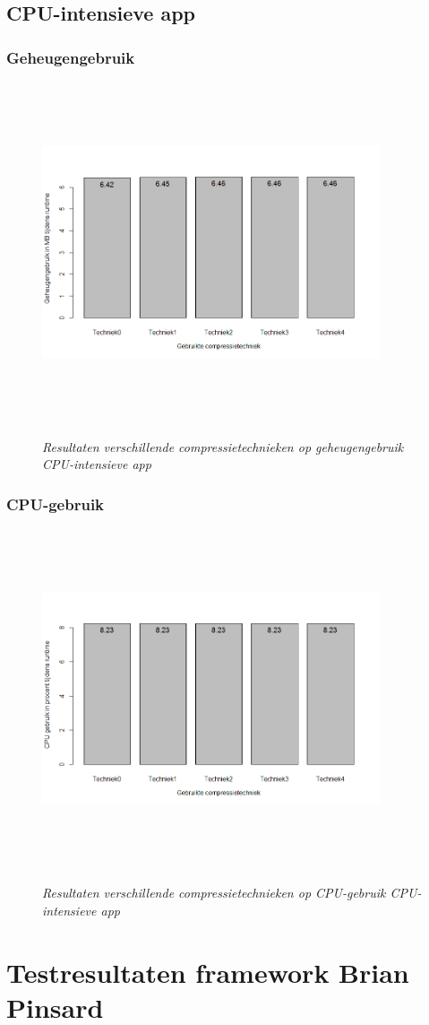 \subsection{CPU-intensieve app}
\subsubsection{Geheugengebruik}
\begin{figure}[H]
	\centering
	\caption{\textit{Resultaten verschillende compressietechnieken op geheugengebruik CPU-intensieve app}}
	\includegraphics[width=10cm, height=10cm, keepaspectratio]{img/app3geheugen}\\[.5cm]
	
\end{figure}
\subsubsection{CPU-gebruik}
\begin{figure}[H]
	\centering
	\caption{\textit{Resultaten verschillende compressietechnieken op CPU-gebruik CPU-intensieve app}}
	\includegraphics[width=10cm, height=10cm, keepaspectratio]{img/app3cpu}\\[.5cm]
	
\end{figure}

 \section{Testresultaten framework Brian Pinsard}
\label{sec:invloedcompressie}